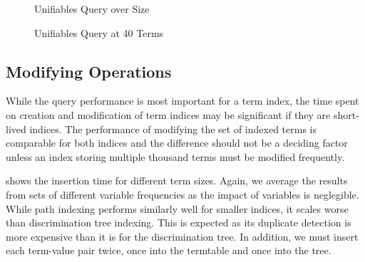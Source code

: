 \begin{figure}[h]
  \begin{minipage}{0.45\textwidth}
\begin{adjustbox}{width=1\textwidth}
\end{adjustbox}
\caption{Unifiables Query over Size}
\label{unif}
\end{minipage}
\begin{minipage}{0.1\textwidth}
\end{minipage}
\begin{minipage}{0.45\textwidth}
\begin{adjustbox}{width=1\textwidth}
\end{adjustbox}
\caption{Unifiables Query at 40 Terms}
\label{unifvar}
\end{minipage}
\end{figure}

\subsection{Modifying Operations}
While the query performance is most important for a term index, the time spent on creation and modification of term indices may be significant if they are short-lived indices. The performance of modifying the set of indexed terms is comparable for both indices and the difference should not be a deciding factor unless an index storing multiple thousand terms must be modified frequently.

 shows the insertion time for different term sizes. Again, we average the results from sets of different variable frequencies as the impact of variables is neglegible.
While path indexing performs similarly well for smaller indices, it scales worse than discrimination tree indexing. This is expected as its duplicate detection is more expensive than it is for the discrimination tree. In addition, we must insert each term-value pair twice, once into the termtable and once into the tree.

